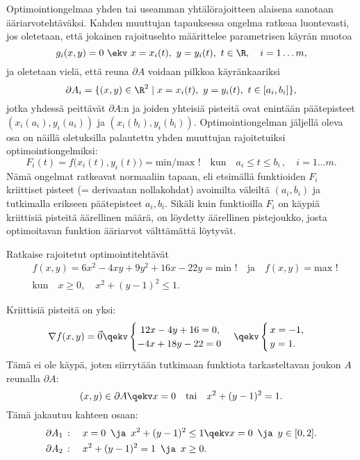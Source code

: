 Optimointiongelmaa yhden tai useamman yhtälörajoitteen alaisena sanotaan  
ääriarvotehtäväksi. Kahden muuttujan tapauksessa ongelma ratkeaa luontevasti, jos oletetaan,
että jokainen rajoitusehto määrittelee parametrisen käyrän muotoa
\[ 
g_i(x,y)=0 \ \ekv \ x=x_i(t), \ y=y_i(t),\ t \in \R, \quad i = 1 \ldots m, 
\]
ja oletetaan vielä, että reuna $\partial A$ voidaan pilkkoa käyränkaariksi
\[ 
\partial A_i = \{(x,y) \in \R^2 \mid x = x_i(t),\ y = y_i(t),\ t \in [a_i,b_i]\}, 
\]
jotka yhdessä peittävät $\partial A$:n ja joiden yhteisiä pisteitä ovat enintään päätepisteet
$(x_i(a_i),y_i(a_i))$ ja $(x_i(b_i),y_i(b_i))$. Optimointiongelman jäljellä oleva osa on näillä
oletuksilla palautettu yhden muuttujan rajoitetuiksi optimointiongelmiksi:
\[ 
F_i(t) = f\bigl(x_i(t),y_i(t)\bigr) = \text{min/max\ !} \quad \text{kun} \quad 
                                      a_i \le t \le b_i\,, \quad i = 1 \ldots m.
\]
Nämä ongelmat ratkeavat normaaliin tapaan, eli etsimällä funktioiden $F_i$ kriittiset pisteet
(= derivaatan nollakohdat) avoimilta väleiltä $(a_i,b_i)$ ja tutkimalla erikseen päätepisteet
$a_i,b_i$. Sikäli kuin funktioilla $F_i$ on käypiä kriittisiä pisteitä äärellinen määrä, on 
löydetty äärellinen pistejoukko, josta optimoitavan funktion ääriarvot välttämättä löytyvät.
\begin{Exa} \label{esim: rajoitettu optimointi} Ratkaise rajoitetut optimointitehtävät
\begin{align*} 
&f(x,y) = 6x^2-4xy+9y^2+16x-22y = \text{min\ !} \quad \text{ja} \quad f(x,y) = \text{max\ !} \\
&\text{kun} \quad x \ge 0,\quad  x^2+(y-1)^2 \le 1.
\end{align*}
\end{Exa}
\ratk Kriittisiä pisteitä on yksi:
\[ 
\nabla f(x,y) = \vec 0 \qekv \begin{cases} 
                             \ 12x-4y+16=0, \\ -4x+18y-22=0 \end{cases} 
                       \qekv \begin{cases} \,x=-1, \\ \,y=1. \end{cases} 
\]
Tämä ei ole käypä, joten siirrytään tutkimaan funktiota tarkasteltavan joukon $A$ reunalla 
$\partial A$:
\[ 
(x,y) \in \partial A \qekv x=0 \quad \text{tai} \quad x^2+(y-1)^2=1. 
\]
Tämä jakautuu kahteen osaan:
\begin{align*}
&\partial A_1\,: \quad x=0\,\ \ja\,\ x^2 + (y-1)^2 \le 1 \qekv x=0\,\ \ja\,\ y \in [0,2]. \\
&\partial A_2\,: \quad x^2 + (y-1)^2 = 1\,\ \ja\,\ x \ge 0.
\end{align*}
